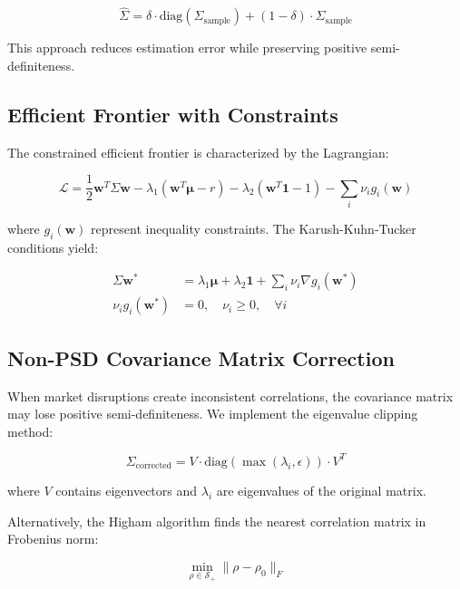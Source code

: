 \documentclass[12pt,a4paper]{article}
\begin{document}
\begin{equation}
\hat{\Sigma} = \delta \cdot \text{diag}(\Sigma_{\text{sample}}) + (1-\delta) \cdot \Sigma_{\text{sample}}
\end{equation}

This approach reduces estimation error while preserving positive semi-definiteness.

\subsection{Efficient Frontier with Constraints}

The constrained efficient frontier is characterized by the Lagrangian:

\begin{equation}
\mathcal{L} = \frac{1}{2}\mathbf{w}^T \Sigma \mathbf{w} - \lambda_1(\mathbf{w}^T \boldsymbol{\mu} - r) - \lambda_2(\mathbf{w}^T \mathbf{1} - 1) - \sum_{i} \nu_i g_i(\mathbf{w})
\end{equation}

where $g_i(\mathbf{w})$ represent inequality constraints. The Karush-Kuhn-Tucker conditions yield:

\begin{align}
\Sigma \mathbf{w}^* &= \lambda_1 \boldsymbol{\mu} + \lambda_2 \mathbf{1} + \sum_{i} \nu_i \nabla g_i(\mathbf{w}^*) \\
\nu_i g_i(\mathbf{w}^*) &= 0, \quad \nu_i \geq 0, \quad \forall i
\end{align}

\subsection{Non-PSD Covariance Matrix Correction}

When market disruptions create inconsistent correlations, the covariance matrix may lose positive semi-definiteness. We implement the eigenvalue clipping method:

\begin{equation}
\Sigma_{\text{corrected}} = V \cdot \text{diag}(\max(\lambda_i, \epsilon)) \cdot V^T
\end{equation}

where $V$ contains eigenvectors and $\lambda_i$ are eigenvalues of the original matrix.

Alternatively, the Higham algorithm \cite{higham2002} finds the nearest correlation matrix in Frobenius norm:

\begin{equation}
\min_{\rho \in \mathcal{S}_+} \|\rho - \rho_0\|_F
\end{equation}
\end{document}
